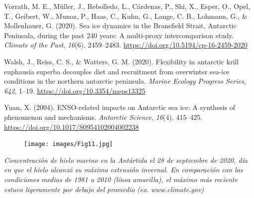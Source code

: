 \documentclass[
]{article}
\newlength{\cslhangindent}
\newenvironment{cslreferences}%
  {\setlength{\parindent}{0pt}%
  \everypar{\setlength{\hangindent}{\cslhangindent}}\ignorespaces}%
  {\par}
\begin{document}
\begin{cslreferences}
\leavevmode\hypertarget{ref-Vorrath2020}{}%
Vorrath, M. E., Müller, J., Rebolledo, L., Cárdenas, P., Shi, X., Esper,
O., Opel, T., Geibert, W., Munoz, P., Haas, C., Kuhn, G., Lange, C. B.,
Lohmann, G., \& Mollenhauer, G. (2020). Sea ice dynamics in the
Bransfield Strait, Antarctic Peninsula, during the past 240 years: A
multi-proxy intercomparison study. \emph{Climate of the Past},
\emph{16}(6), 2459--2483. \url{https://doi.org/10.5194/cp-16-2459-2020}

\leavevmode\hypertarget{ref-Walsh2020}{}%
Walsh, J., Reiss, C. S., \& Watters, G. M. (2020). Flexibility in
antarctic krill euphausia superba decouples diet and recruitment from
overwinter sea-ice conditions in the northern antarctic peninsula.
\emph{Marine Ecology Progress Series}, \emph{642}, 1--19.
\url{https://doi.org/10.3354/meps13325}

\leavevmode\hypertarget{ref-Yuan2004}{}%
Yuan, X. (2004). ENSO-related impacts on Antarctic sea ice: A synthesis
of phenomenon and mechanisms. \emph{Antarctic Science}, \emph{16}(4),
415--425. \url{https://doi.org/10.1017/S0954102004002238}
\end{cslreferences}


\newpage
\begin{figure}

\vspace*{1cm}
\texttt{[image: images/Fig11.jpg]}

\end{figure}

\vspace*{0.5cm}

\begin{center}
\emph{Concentración de hielo marino en la Antártida el 28 de septiembre de 2020, día en que el hielo alcanzó su máxima extensión invernal. En comparación con las condiciones medias de 1981 a 2010 (línea amarilla), el máximo más reciente estuvo ligeramente por debajo del promedio (ex. www.climate.gov)}


\end{center}
\end{document}
